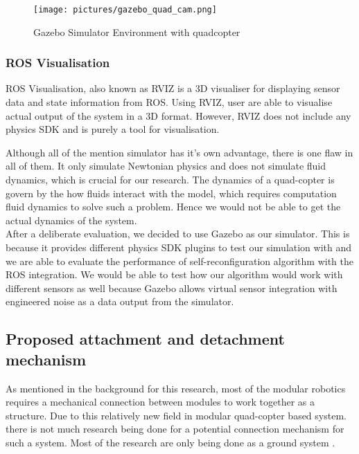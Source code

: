 \documentclass[12pt,A4]{article}
\begin{document}
	\begin{figure}[h!]
		\centering
		\texttt{[image: pictures/gazebo\_quad\_cam.png]}
		\caption{Gazebo Simulator Environment with quadcopter}
	\end{figure}
	
	\subsubsection{ROS Visualisation}
	\hfill\begin{minipage}{\dimexpr\textwidth-1cm}
	ROS Visualisation, also known as RVIZ is a 3D visualiser for displaying sensor data and state information from ROS. Using RVIZ, user are able to visualise actual output of the system in a 3D format. However, RVIZ does not include any physics SDK and is purely a tool for visualisation.\\
	\end{minipage}
	
	Although all of the mention simulator has it's own advantage, there is one flaw in all of them. It only simulate Newtonian physics and does not simulate fluid dynamics, which is crucial for our research. The dynamics of a quad-copter is govern by the how fluids interact with the model, which requires computation fluid dynamics to solve such a problem. Hence we would not be able to get the actual dynamics of the system.\\
	
	After a deliberate evaluation, we decided to use Gazebo as our simulator. This is because it provides different physics SDK plugins to test our simulation with and we are able to evaluate the performance of self-reconfiguration algorithm with the ROS integration. We would be able to test how our algorithm would work with different sensors as well because Gazebo allows virtual sensor integration with engineered noise as a data output from the simulator.\\
	
	\subsection{Proposed attachment and detachment mechanism}
	
	As mentioned in the background for this research, most of the modular robotics requires a mechanical connection between modules to work together as a structure. Due to this relatively new field in modular quad-copter based system. there is not much research being done for a potential connection mechanism for such a system. Most of the research are only being done as a ground system \citep{yim2007modular}. \\
	
\end{document}
